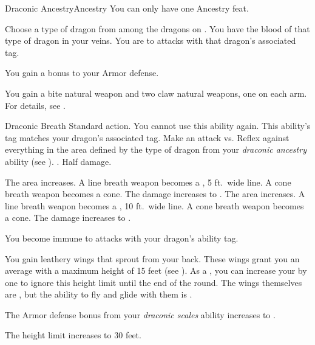   \begin{feat}{Draconic Ancestry}{Ancestry}
     You can only have one Ancestry feat.

     Choose a type of dragon from among the dragons on .
    You have the blood of that type of dragon in your veins.
    You are  to attacks with that dragon's associated tag.

     You gain a  bonus to your Armor defense.

     You gain a bite natural weapon and two claw natural weapons, one on each arm.
    For details, see .

    \begin{activeability}{Draconic Breath}
      \abilityusagetime Standard action.
      \abilitycost You  cannot use this ability again.
      \rankline
      This ability's tag matches your dragon's associated tag.
      Make an attack vs. Reflex against everything in the area defined by the type of dragon from your \textit{draconic ancestry} ability (see ).
      \hit \damagerankthree.
      \miss Half damage.

      \rankline
       The area increases.
      A line breath weapon becomes a \arealarge, 5 ft.\ wide line.
      A cone breath weapon becomes a \areamed cone.
       The damage increases to \damagerankfive.
       The area increases.
      A line breath weapon becomes a \areahuge, 10 ft.\ wide line.
      A cone breath weapon becomes a \arealarge cone.
       The damage increases to \damagerankseven.
    \end{activeability}

     You become immune to attacks with your dragon's ability tag.

     You gain leathery wings that sprout from your back.
    These wings grant you an average  with a maximum height of 15 feet (see ).
    As a , you can increase your  by one to ignore this height limit until the end of the round.
    The wings themselves are , but the ability to fly and glide with them is \magical.

     The Armor defense bonus from your \textit{draconic scales} ability increases to .

     The height limit increases to 30 feet.
  \end{feat}


